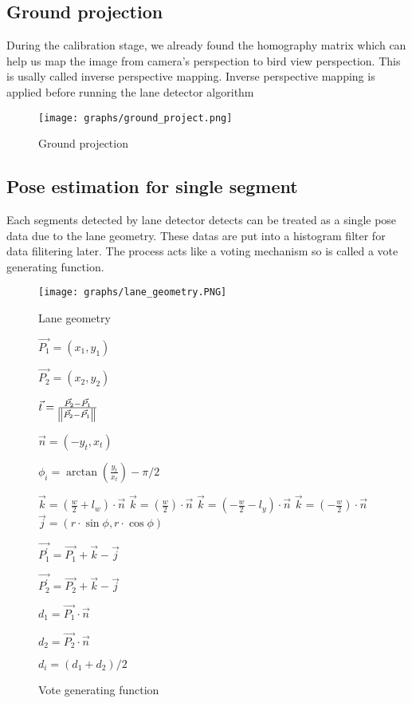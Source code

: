 \documentclass{article}
\begin{document}
\subsection{Ground projection}

During the calibration stage, we already found the homography matrix which can help us map the image from camera's perspection to bird view perspection. This is usally called inverse perspective mapping. Inverse perspective mapping is applied before running the lane detector algorithm

\begin{figure}[ht]
  \label{fig:ground projection}
  \centering
  \texttt{[image: graphs/ground\_project.png]}
  \caption{Ground projection}
\end{figure}
\FloatBarrier

\subsection{Pose estimation for single segment}

Each segments detected by lane detector detects can be treated as a single pose data due to the lane geometry. These datas are put into a histogram filter for data filitering later. The process acts like a voting mechanism so is called a vote generating function.

\begin{figure}[ht]
  \label{fig:lane_geometry}
  \centering
  \texttt{[image: graphs/lane\_geometry.PNG]}
  \caption{Lane geometry}
\end{figure}
\FloatBarrier

\begin{figure} [ht]
\begin{algorithm}[H]
	$\vec{P_1} = (x_1, y_1)$

	$\vec{P_2} = (x_2, y_2)$

	$\vec{t} = \frac{\vec{P_2} - \vec{P_1}}
					{\norm{\vec{P_2} - \vec{P_1}}}$

	$\vec{n} = (-y_t, x_t)$

	$\phi_{i} = \arctan(\frac{y_t}{x_t}) - \pi / 2$

		{
			{
				$\vec{k} = (\frac{w}{2} + l_w) \cdot \vec{n}$
			}
			{
				$\vec{k} = (\frac{w}{2}) \cdot \vec{n}$
			}
		}
		{
			{
				$\vec{k} = (-\frac{w}{2} - l_y) \cdot \vec{n}$
			}
			{
				$\vec{k} = (-\frac{w}{2}) \cdot \vec{n}$
			}
		}
	$\vec{j} = (r \cdot \sin\phi, r \cdot \cos\phi)$

	$\vec{P_1^\prime} = \vec{P_1} + \vec{k} - \vec{j}$

	$\vec{P_2^\prime} = \vec{P_2} + \vec{k} - \vec{j}$

	$d_1 = \vec{P_1} \cdot \vec{n}$

	$d_2 = \vec{P_2} \cdot \vec{n}$

	$d_{i} = (d_1 + d_2) / 2$
	\caption{Vote generating function}
\end{algorithm}
\end{figure}
\FloatBarrier
\end{document}
